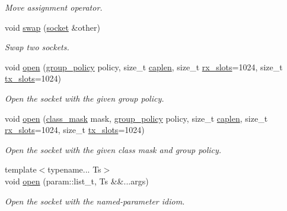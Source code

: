 \begin{DoxyCompactItemize}
\begin{DoxyCompactList}\small\item\em Move assignment operator. \end{DoxyCompactList}\item 
void \hyperlink{classpfq_1_1socket_ac80ebddf3a94f7964c74bf02954704ce}{swap} (\hyperlink{classpfq_1_1socket}{socket} \&other)
\begin{DoxyCompactList}\small\item\em Swap two sockets. \end{DoxyCompactList}\item 
void \hyperlink{classpfq_1_1socket_a432ea40ac382d251b105e3d5987b9b4a}{open} (\hyperlink{namespacepfq_ac41249c8510558905b01fa4d866a38d7}{group\+\_\+policy} policy, size\+\_\+t \hyperlink{classpfq_1_1socket_ab68dbba5ef01041b9c96758c4a9f0a6c}{caplen}, size\+\_\+t \hyperlink{classpfq_1_1socket_a5cf700fc12d67b91df3d669ac4aa737a}{rx\+\_\+slots}=1024, size\+\_\+t \hyperlink{classpfq_1_1socket_a019d15a072c043d6a1333ca0c836da4c}{tx\+\_\+slots}=1024)
\begin{DoxyCompactList}\small\item\em Open the socket with the given group policy. \end{DoxyCompactList}\item 
void \hyperlink{classpfq_1_1socket_ab86880ccdfdd9f875e376c6c8d22a2bb}{open} (\hyperlink{namespacepfq_a96af1f5ed530eff563eb917516758fbb}{class\+\_\+mask} mask, \hyperlink{namespacepfq_ac41249c8510558905b01fa4d866a38d7}{group\+\_\+policy} policy, size\+\_\+t \hyperlink{classpfq_1_1socket_ab68dbba5ef01041b9c96758c4a9f0a6c}{caplen}, size\+\_\+t \hyperlink{classpfq_1_1socket_a5cf700fc12d67b91df3d669ac4aa737a}{rx\+\_\+slots}=1024, size\+\_\+t \hyperlink{classpfq_1_1socket_a019d15a072c043d6a1333ca0c836da4c}{tx\+\_\+slots}=1024)
\begin{DoxyCompactList}\small\item\em Open the socket with the given class mask and group policy. \end{DoxyCompactList}\item 
{\footnotesize template$<$typename... Ts$>$ }\\void \hyperlink{classpfq_1_1socket_a33c3e305c62f5a9f8a0ef74f69097ecf}{open} (param\+::list\+\_\+t, Ts \&\&...args)
\begin{DoxyCompactList}\small\item\em Open the socket with the named-\/parameter idiom. \end{DoxyCompactList}\item 

\end{DoxyCompactItemize}
